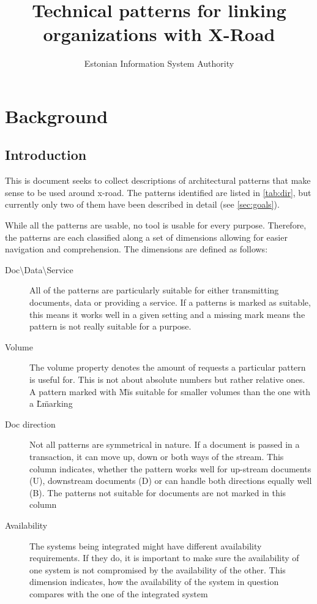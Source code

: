 \documentclass[10pt,a4paper]{article}
\title{Technical patterns for linking organizations with X-Road}
\author{Estonian Information System Authority}
\begin{document}
\maketitle
\clearpage

\tableofcontents
\clearpage

\section{Background}
\subsection{Introduction}
This is document seeks to collect descriptions of architectural patterns that make sense to be used around x-road. The patterns identified are listed in \ref{tab:dir}, but currently only two of them have been described in detail (see \ref{sec:goals}).

While all the patterns are usable, no tool is usable for every purpose. Therefore, the patterns are each classified along a set of dimensions allowing for easier navigation and comprehension. The dimensions are defined as follows:
\begin{description}
	\item[Doc\textbackslash Data\textbackslash Service] All of the patterns are particularly suitable for either transmitting documents, data or providing a service. If a patterns is marked as suitable, this means it works well in a given setting and a missing mark means the pattern is not really suitable for a purpose. 
	\item[Volume] The volume property denotes the amount of requests a particular pattern is useful for. This is not about absolute numbers but rather relative ones. A pattern marked with \"M\" is suitable for smaller volumes than the one with a \"L\" marking
	\item[Doc direction] Not all patterns are symmetrical in nature. If a document is passed in a transaction, it can move up, down or both ways of the stream. This column indicates, whether the pattern works well for up-stream documents (U), downstream documents (D) or can handle both directions equally well (B). The patterns not suitable for documents are not marked in this column
	 \item[Availability] The systems being integrated might have different availability requirements. If they do, it is important to make sure the availability of one system is not compromised by the availability of the other. This dimension indicates, how the availability of the system in question compares with the one of the integrated system
\end{description}
\end{document}
